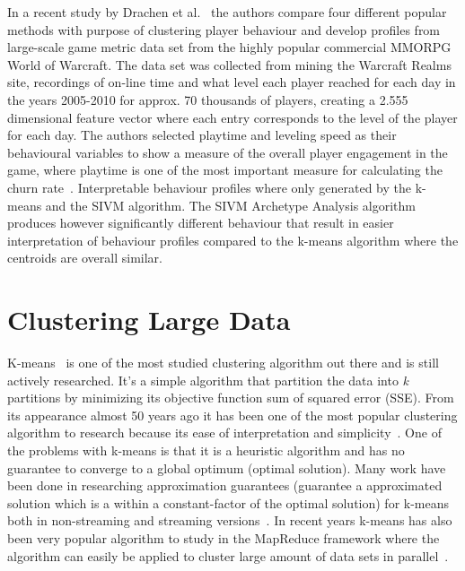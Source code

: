 In a recent study by Drachen et al.~\citep{Drachen:2013} the authors compare four different popular methods with purpose of clustering player behaviour and develop profiles from large-scale game metric data set from the highly popular commercial MMORPG World of Warcraft. The data set was collected from mining the Warcraft Realms site, recordings of on-line time and what level each player reached for each day in the years 2005-2010 for approx. 70 thousands of players, creating a 2.555 dimensional feature vector where each entry corresponds to the level of the player for each day. The authors selected playtime and leveling speed as their behavioural variables to show a measure of the overall player engagement in the game, where playtime is one of the most important measure for calculating the churn rate~\citep{Fields:2011SocialGame, Seif:2013GameAnalytics}. Interpretable behaviour profiles where only generated by the k-means and the SIVM algorithm. The SIVM Archetype Analysis algorithm produces however significantly different behaviour that result in easier interpretation of behaviour profiles compared to the k-means algorithm where the centroids are overall similar.	

\section{Clustering Large Data}
K-means~\citep{FORGYE.W.:1965, MacQueen:1967KMeans, Lloyd:1982} is one of the most studied clustering algorithm out there and is still actively researched. It's a simple algorithm that partition the data into \textit{k} partitions by minimizing its objective function sum of squared error (SSE). From its appearance almost 50 years ago it has been one of the most popular clustering algorithm to research because its ease of interpretation and simplicity~\citep{Xu:2005Clustering, Jain:2008KMSurvey, Rokach:2010Survey}. One of the problems with k-means is that it is a heuristic algorithm and has no guarantee to converge to a global optimum (optimal solution). Many work have been done in researching approximation guarantees (guarantee a approximated solution which is a within a constant-factor of the optimal solution) for k-means both in non-streaming and streaming versions~\citep{Kanungo:2002KM, Arthur:2007, Ailon:2009, Braverman:2011, Shindler:2011}. In recent years k-means has also been very popular algorithm to study in the MapReduce framework where the algorithm can easily be applied to cluster large amount of data sets in parallel~\citep{Dean:2004, Zhao:2009, Ngazimbi:2009MSc, Christopoulos:2011Thesis, Ramamoorthy:2011MSc}.

